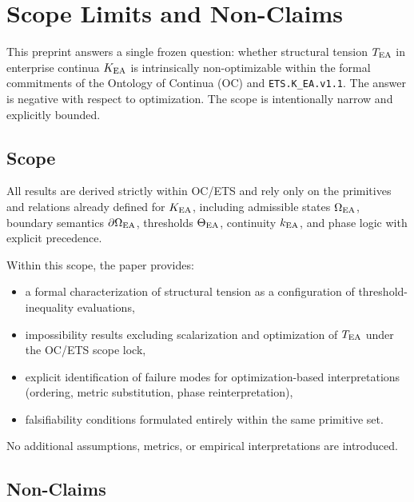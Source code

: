 
\section{Scope Limits and Non-Claims}

This preprint answers a single frozen question: whether structural tension
$T_{\mathrm{EA}}$ in enterprise continua $K_{\mathrm{EA}}$ is intrinsically non-optimizable within
the formal commitments of the Ontology of Continua (OC) and
\texttt{ETS.K\_EA.v1.1}. The answer is negative with respect to optimization.
The scope is intentionally narrow and explicitly bounded.

\subsection{Scope}

All results are derived strictly within OC/ETS and rely only on the
primitives and relations already defined for $K_{\mathrm{EA}}$, including admissible
states $\Omega_{\mathrm{EA}}$, boundary semantics $\partial\Omega_{\mathrm{EA}}$, thresholds $\Theta_{\mathrm{EA}}$,
continuity $k_{\mathrm{EA}}$, and phase logic with explicit precedence.

Within this scope, the paper provides:
\begin{itemize}
  \item a formal characterization of structural tension as a configuration
        of threshold-inequality evaluations,
  \item impossibility results excluding scalarization and optimization of
        $T_{\mathrm{EA}}$ under the OC/ETS scope lock,
  \item explicit identification of failure modes for optimization-based
        interpretations (ordering, metric substitution, phase
        reinterpretation),
  \item falsifiability conditions formulated entirely within the same
        primitive set.
\end{itemize}

No additional assumptions, metrics, or empirical interpretations are
introduced.

\subsection{Non-Claims}

